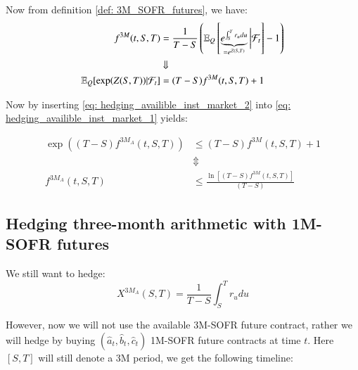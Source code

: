 Now from definition \ref{def: 3M_SOFR_futures}, we have: 
\begin{align}
\label{eq: hedging_availible_inst_market_2}
f^{3M}(t,S,T) &= \frac{1}{T-S}\left(
\mathbb{E}_{Q}\left[
\underbrace{e^{\int_{S}^{T}r_{u}du}}_{=e^{Z(S,T)}}
\bigg{|}\mathcal{F}_{t}\right] - 1
\right) \nonumber \\ 
&\Downarrow \nonumber \\ 
\mathbb{E}_{Q}[\exp(Z(S,T))|\mathcal{F}_{t}] &= (T-S)f^{3M}(t,S,T) + 1
\end{align}

Now by inserting \ref{eq: hedging_availible_inst_market_2} into \ref{eq: hedging_availible_inst_market_1} yields:

\begin{align*}
\exp\left(
(T-S)f^{3M_{A}}(t,S,T)
\right) 
&\leq 
(T-S)f^{3M}(t,S,T) + 1 \\ 
&\Updownarrow \\
f^{3M_{A}}(t,S,T) &\leq 
\frac{
\ln[(T-S)f^{3M}(t,S,T)]
}{
(T-S)
}
\end{align*}

\newpage 

\subsection{Hedging three-month arithmetic with 1M-SOFR futures}
\label{sec: 3M_A_vs_(a,b,c)_1M_SOFR}
We still want to hedge: 
$$
X^{3M_{A}}(S,T) = \frac{1}{T-S}\int_{S}^{T}r_{u}du
$$

However, now we will not use the available 3M-SOFR future contract, rather we will hedge by buying $(\hat{a}_{t}, \hat{b}_{t}, \hat{c}_{t})$ 1M-SOFR future contracts at time $t$. Here $[S,T]$ will still denote a 3M period, we get the following timeline:



